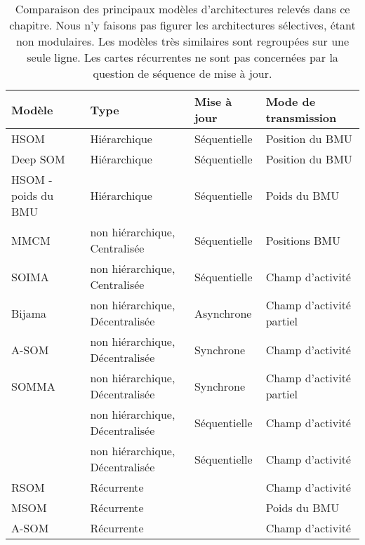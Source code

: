 \documentclass[../main]{subfiles}
\begin{document}
\begin{table}[t!]
    \renewcommand{\arraystretch}{1.5}
    \caption{Comparaison des principaux modèles d'architectures relevés dans ce chapitre. Nous n'y faisons pas figurer les architectures sélectives, étant non modulaires. Les modèles très similaires sont regroupées sur une seule ligne. Les cartes récurrentes ne sont pas concernées par la question de séquence de mise à jour. \label{tab:bib}}
    \vspace{5mm}
    \begin{tabular}{p{2cm}p{6cm}p{2cm}p{5cm}}
        Modèle& Type& Mise à jour& Mode de transmission   \\
        \hline
        HSOM\tnote{1}& Hiérarchique & Séquentielle & Position du BMU  \\
        Deep SOM\tnote{2} & Hiérarchique & Séquentielle & Position du BMU   \\
        HSOM - poids du BMU\tnote{3} & Hiérarchique & Séquentielle & Poids du BMU \\
        \hline
        MMCM \tnote{4} & non hiérarchique, Centralisée & Séquentielle    & Positions BMU    \\                  
        SOIMA\tnote{5} & non hiérarchique, Centralisée & Séquentielle    & Champ d'activité \\
        Bijama\tnote{6} & non hiérarchique, Décentralisée &   Asynchrone    & Champ d'activité partiel \\ 
        A-SOM  \tnote{7} & non hiérarchique, Décentralisée       & Synchrone       & Champ d'activité \\
        SOMMA  \tnote{8}          & non hiérarchique, Décentralisée       & Synchrone       & Champ d'activité partiel \\
        \cite{jayaratne_bio-inspired_2018}           & non hiérarchique, Décentralisée       & Séquentielle    & Champ d'activité \\
        \cite{khacef_brain-inspired_2020}            & non hiérarchique, Décentralisée       & Séquentielle    & Champ d'activité \\
        \hline
        RSOM  \tnote{9}      & Récurrente                            &                & Champ d'activité \\
        MSOM   \tnote{10}& Récurrente                                   &                & Poids du BMU\\
        A-SOM   \tnote{11}& Récurrente                            &                & Champ d'activité\\

\end{tabular}
\end{table}
\end{document}
